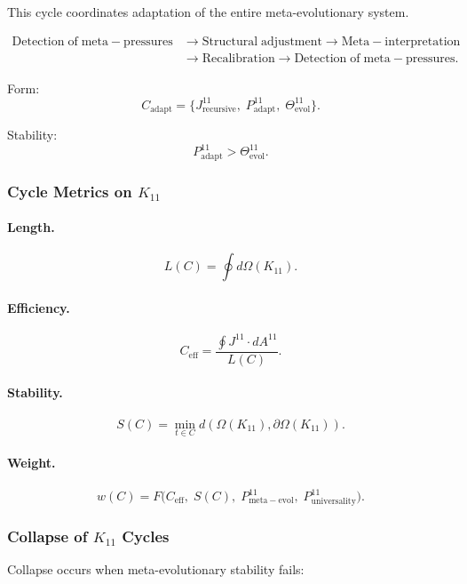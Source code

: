 This cycle coordinates adaptation of the entire meta-evolutionary system.

\[
  \begin{aligned}
  \mathrm{Detection\;of\;meta\!-\!pressures}
  &\to \mathrm{Structural\;adjustment}
  \to \mathrm{Meta\!-\!interpretation}\\
  &\to \mathrm{Recalibration}
  \to \mathrm{Detection\;of\;meta\!-\!pressures}.
  \end{aligned}
\]

Form:
\[
  C_{\mathrm{adapt}}
  =
  \{
    J^{11}_{\mathrm{recursive}},\;
    P^{11}_{\mathrm{adapt}},\;
    \Theta^{11}_{\mathrm{evol}}
  \}.
\]

Stability:
\[
  P^{11}_{\mathrm{adapt}}>\Theta^{11}_{\mathrm{evol}}.
\]


\subsubsection{Cycle Metrics on $K_{11}$}

\paragraph{Length.}
\[
  L(C)=\oint d\Omega(K_{11}).
\]

\paragraph{Efficiency.}
\[
  C_{\mathrm{eff}}
  =\frac{\oint J^{11}\cdot dA^{11}}{L(C)}.
\]

\paragraph{Stability.}
\[
  S(C)
  =\min_{t\in C} d(\Omega(K_{11}),\partial\Omega(K_{11})).
\]

\paragraph{Weight.}
\[
  w(C)
  =F\!\big(
        C_{\mathrm{eff}},\;
        S(C),\;
        P^{11}_{\mathrm{meta\!-\!evol}},\;
        P^{11}_{\mathrm{universality}}
      \big).
\]


\subsubsection{Collapse of $K_{11}$ Cycles}

Collapse occurs when meta-evolutionary stability fails:

